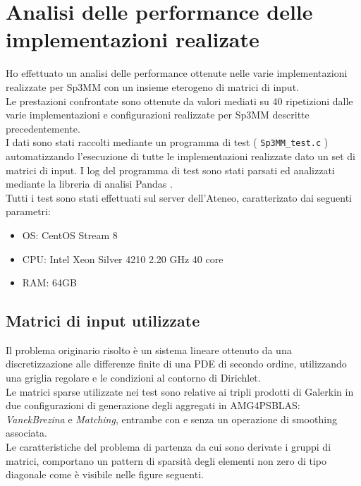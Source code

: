 \chapter{Analisi delle performance delle implementazioni realizate}
\label{ChPerf}

Ho effettuato un analisi delle performance ottenute nelle varie implementazioni 
realizzate per Sp3MM con un insieme eterogeno di matrici di input.\\
Le prestazioni confrontate sono ottenute da valori mediati su 40 ripetizioni
dalle varie implementazioni e configurazioni realizzate per Sp3MM descritte precedentemente.\\
I dati sono stati raccolti mediante un programma di test ( \verb|Sp3MM_test.c| ) automatizzando
l'esecuzione di tutte le implementazioni realizzate dato un set di matrici di input.
I log del programma di test sono stati parsati ed analizzati mediante la libreria di analisi Pandas \cite{pandasMan}.\\
Tutti i test sono stati effettuati sul server dell'Ateneo, caratterizato dai seguenti parametri:
\begin{itemize}
	\item	 OS:	CentOS Stream 8
	\item	CPU:	Intel Xeon Silver 4210 2.20 GHz 40 core
	\item	RAM:	64GB
\end{itemize}

\section{Matrici di input utilizzate} \label{chPerf:inputs}
Il problema originario risolto è un sistema lineare ottenuto da 
una discretizzazione alle differenze finite 
di una PDE di secondo ordine,
utilizzando una griglia regolare e le condizioni al contorno di Dirichlet.\\ %
Le matrici sparse utilizzate nei test
sono relative ai tripli prodotti di Galerkin in due configurazioni
di generazione degli aggregati in AMG4PSBLAS:
\emph{VanekBrezina} e \emph{Matching}, entrambe con e senza un operazione di smoothing associata.\\
Le caratteristiche del problema di partenza da cui sono derivate i gruppi di matrici,
comportano un pattern di sparsità degli elementi non zero di tipo diagonale 
come è visibile nelle figure seguenti.\\

